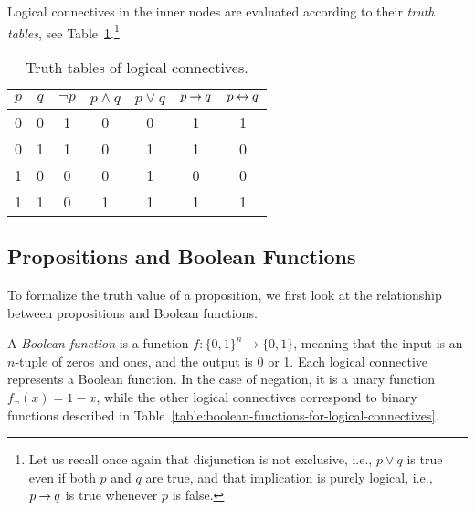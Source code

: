 Logical connectives in the inner nodes are evaluated according to their \emph{truth tables}, see Table~\ref{table:logical-connectives}.\footnote{Let us recall once again that disjunction is not exclusive, i.e., $p \lor q$ is true even if both $p$ and $q$ are true, and that implication is purely logical, i.e., $p \mathbin{\rightarrow} q$ is true whenever $p$ is false.}

\begin{table}[htbp]
    \centering
    \begin{tabular}{@{}cc|ccccc@{}}
        \toprule
        $p$ & $q$ & $\neg p$ & $p \land q$ & $p \lor q$ & $p \mathbin{\rightarrow} q$ & $p \mathbin{\leftrightarrow} q$ \\ \midrule
        0   & 0   & 1        & 0          & 0         & 1          & 1          \\
        0   & 1   & 1        & 0          & 1         & 1          & 0          \\
        1   & 0   & 0        & 0          & 1         & 0          & 0          \\
        1   & 1   & 0        & 1          & 1         & 1          & 1          \\ \bottomrule
    \end{tabular}
    \caption{Truth tables of logical connectives.}
    \label{table:logical-connectives}
\end{table}

\subsection{Propositions and Boolean Functions}

To formalize the truth value of a proposition, we first look at the relationship between propositions and Boolean functions. 

A \emph{Boolean function} is a function $f\colon\{0,1\}^n\to\{0,1\}$, meaning that the input is an $n$-tuple of zeros and ones, and the output is 0 or 1. Each logical connective represents a Boolean function. In the case of negation, it is a unary function $f_\neg(x)=1-x$, while the other logical connectives correspond to binary functions described in Table~\ref{table:boolean-functions-for-logical-connectives}.

